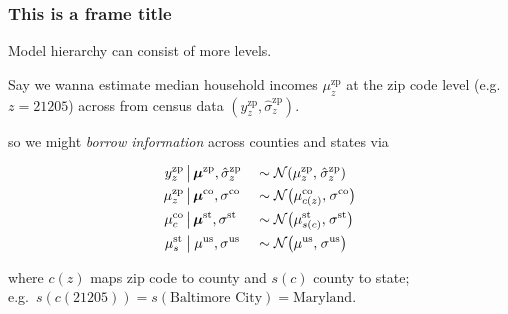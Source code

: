 \documentclass[18pt]{beamer}
\newcommand{\frametitleText}{This is a frame title}
\begin{document}
\newcommand{\randomIntModel}{%
	\begin{alignat*}{2}
	y_z^\mathrm{zp} \, 
		&\big| 
		\, \bm{\mu}^\mathrm{zp}, \hat{\sigma}^\mathrm{zp}_z
		&&\sim \normalDist(\mu_z^\mathrm{zp}, \thinnerspace 
		\hat{\sigma}_z^\mathrm{zp}) \\
	\mu_z^\mathrm{zp} \, 
		&\big| \, 
		\bm{\mu}^\mathrm{co}, \sigma^\mathrm{co}
		&&\sim \normalDist\bigl( 
		\mu^\mathrm{co}_{c(z)}, \thinnerspace
		\sigma^{\mathrm{co}}
		\bigr) \\
	\mu^\mathrm{co}_{c} \,
		&\big| \, 
		\bm{\mu}^\mathrm{st}, \sigma^\mathrm{st}
		&&\sim \normalDist\bigl( 
		\mu^\mathrm{st}_{s(c)}, \thinnerspace
		\sigma^\mathrm{st} 
		\bigr) \\
	\mu^\mathrm{st}_{s} \, \thinnerspace
		&\big| \, \thinnerspace
		\mu^\mathrm{us}, \sigma^\mathrm{us}
		&&\sim \normalDist\bigl( 
		\mu^\mathrm{us}, \thinnerspace
		\sigma^\mathrm{us}
		\bigr)
	\end{alignat*}
}%
\begin{frame}
\frametitle{\frametitleText}
\vspace{-2pt}
Model hierarchy can consist of more levels.
\vspace{2pt}

\pause%
Say we wanna estimate median household incomes $\mu_z^\mathrm{zp}$ at the zip code level (e.g.\ $z = \text{21205}$) across  from census data $(y_z^\mathrm{zp}, \hat{\sigma}_z^\mathrm{zp})$.

\pause%
\smallskip
{}
so we might \textit{borrow information} across counties and states via
{\setlength{\abovedisplayskip}{.15\baselineskip}%
\setlength{\belowdisplayskip}{.25\baselineskip}%
\randomIntModel
}%
where $c(z)$ maps zip code to county and $s(c)$ county to state; \\
e.g.\
$s(c(\text{21205})) = s(\text{Baltimore City}) = \text{Maryland}$.
\end{frame}
\end{document}

